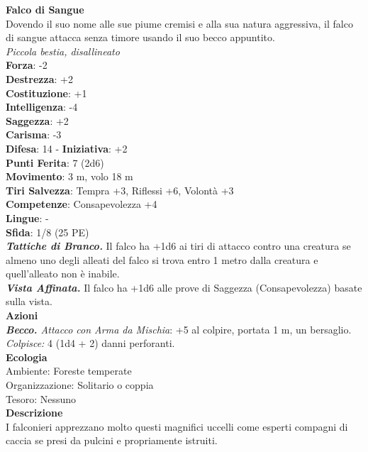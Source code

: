 \begin{multicols}{2}
\medskip\textbf{Falco di Sangue}\\
Dovendo il suo nome alle sue piume cremisi e alla sua natura aggressiva, il falco di sangue attacca senza timore usando il suo becco appuntito.\\
\emph{Piccola bestia, disallineato}\\
\textbf{Forza}: -2\\
\textbf{Destrezza}: +2\\
\textbf{Costituzione}: +1\\
\textbf{Intelligenza}: -4\\
\textbf{Saggezza}: +2\\
\textbf{Carisma}: -3\\
\textbf{Difesa}: 14 - \textbf{Iniziativa}: +2\\
\textbf{Punti Ferita}: 7 (2d6)\\
\textbf{Movimento}: 3 m, volo 18 m\\
\textbf{Tiri Salvezza}: Tempra +3, Riflessi +6, Volontà +3 \\
\textbf{Competenze}: Consapevolezza +4\\
\textbf{Lingue}: -\\
\textbf{Sfida}: 1/8 (25 PE)\smallskip\\
\emph{\textbf{Tattiche di Branco.}} Il falco ha +1d6 ai tiri di attacco contro una creatura se almeno uno degli alleati del falco si trova entro 1 metro dalla creatura e quell'alleato non è inabile.\\
\emph{\textbf{Vista Affinata.}} Il falco ha +1d6 alle prove di Saggezza (Consapevolezza) basate sulla vista.\\
\smallskip\textbf{Azioni}\\
\emph{\textbf{Becco.} Attacco con Arma da Mischia}: +5 al colpire, portata 1 m, un bersaglio.\\
\emph{Colpisce:} 4 (1d4 + 2) danni perforanti.\\
\textbf{Ecologia}\\
Ambiente: Foreste temperate\\
Organizzazione: Solitario o coppia\\
Tesoro: Nessuno\\
\textbf{Descrizione}\\
I falconieri apprezzano molto questi magnifici uccelli come esperti compagni di caccia se presi da pulcini e propriamente istruiti. \\



\end{multicols}

